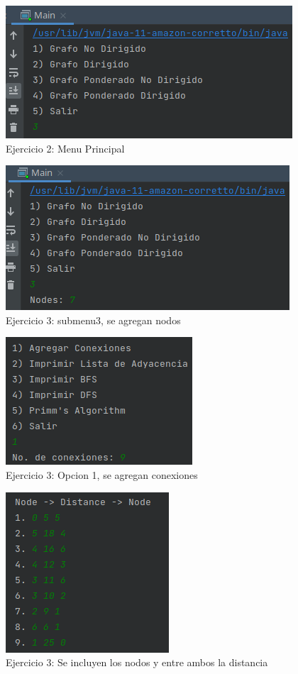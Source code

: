 \documentclass{article}
\begin{document}
			\begin{figure}[H]
				\centering
				\includegraphics[scale= 0.9]{images/e31.png}
				\caption*{Ejercicio 2: Menu Principal}
			\end{figure}
			
			\begin{figure}[H]
				\centering
				\includegraphics[scale= 0.9]{images/e32.png}
				\caption*{Ejercicio 3: submenu3, se agregan nodos}
			\end{figure}
			
			\begin{figure}[H]
				\centering
				\includegraphics[scale= 1]{images/e33.png}
				\caption*{Ejercicio 3: Opcion 1, se agregan conexiones}
			\end{figure}
			
			\begin{figure}[H]
				\centering
				\includegraphics[scale= 1]{images/e34.png}
				\caption*{Ejercicio 3: Se incluyen los nodos y entre ambos la distancia}
			\end{figure}
			
\end{document}
